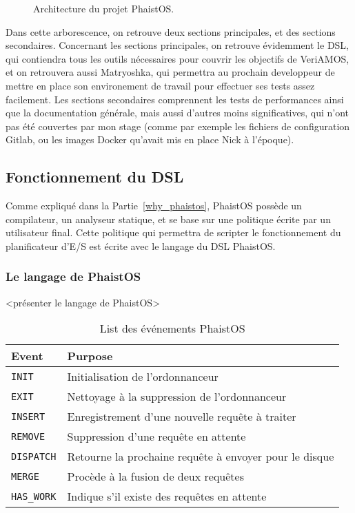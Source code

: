 \begin{figure}[h!t] \centering
    \caption{Architecture du projet PhaistOS.}
    \label{fig:arch}
\end{figure}

Dans cette arborescence, on retrouve deux sections principales, et des sections 
secondaires. Concernant les sections principales, on retrouve évidemment le 
DSL, qui contiendra tous les outils nécessaires pour couvrir les objectifs de 
VeriAMOS, et on retrouvera aussi Matryoshka, qui permettra au prochain 
developpeur de mettre en place son environement de travail pour effectuer ses 
tests assez facilement. Les sections secondaires comprennent les tests de 
performances ainsi que la documentation générale, mais aussi d'autres moins 
significatives, qui n'ont pas été couvertes par mon stage (comme par exemple 
les fichiers de configuration Gitlab, ou les images Docker qu'avait mis en 
place Nick à l'époque).

\subsection{Fonctionnement du DSL}

Comme expliqué dans la Partie~\ref{why_phaistos}, PhaistOS possède un 
compilateur, un analyseur statique, et se base sur une politique écrite par un 
utilisateur final. Cette politique qui permettra de scripter le fonctionnement 
du planificateur d'E/S est écrite avec le langage du DSL PhaistOS.

\subsubsection{Le langage de PhaistOS}

<présenter le langage de PhaistOS>

\begin{table}[h!t]
    \centering
    \begin{tabular}{|l|l|} \hline
      \textbf{Event} & \textbf{Purpose} \\ \hline
      \texttt{INIT} & Initialisation de l'ordonnanceur \\
      \texttt{EXIT} & Nettoyage à la suppression de l'ordonnanceur \\
      \texttt{INSERT} & Enregistrement d'une nouvelle requête à traiter \\
      \texttt{REMOVE} & Suppression d'une requête en attente \\
      \texttt{DISPATCH} & Retourne la prochaine requête à envoyer pour le 
      disque \\
      \texttt{MERGE} & Procède à la fusion de deux requêtes \\
      \texttt{HAS\_WORK} & Indique s'il existe des requêtes en attente \\ \hline
    \end{tabular}
    \caption{List des événements PhaistOS}
    \label{tab:phaistos-events}
\end{table}

